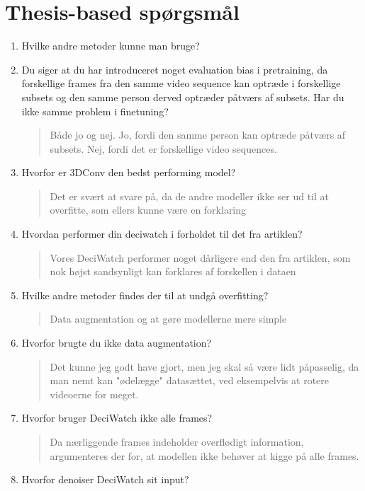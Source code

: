 \documentclass[a4paper]{report}
\begin{document}
\section*{Thesis-based spørgsmål}
\begin{enumerate}
    \item Hvilke andre metoder kunne man bruge?
    \item Du siger at du har introduceret noget evaluation bias i pretraining, da forskellige frames fra den samme video sequence kan optræde i forskellige subsets og den samme person derved optræder påtværs af subsets. Har du ikke samme problem i finetuning?
    \begin{quote}
        Både jo og nej. Jo, fordi den samme person kan optræde påtværs af subsets. Nej, fordi det er forskellige video sequences.
    \end{quote}
    \item Hvorfor er 3DConv den bedst performing model?
    \begin{quote}
        Det er svært at svare på, da de andre modeller ikke ser ud til at overfitte, som ellers kunne være en forklaring
    \end{quote}
    \item Hvordan performer din deciwatch i forholdet til det fra artiklen?
    \begin{quote}
        Vores DeciWatch performer noget dårligere end den fra artiklen, som nok højst sandsynligt kan forklares af forskellen i dataen
    \end{quote}
    \item Hvilke andre metoder findes der til at undgå overfitting?
    \begin{quote}
        Data augmentation og at gøre modellerne mere simple
    \end{quote}
    \item Hvorfor brugte du ikke data augmentation?
    \begin{quote}
        Det kunne jeg godt have gjort, men jeg skal så være lidt påpasselig, da man nemt kan "ødelægge" datasættet, ved eksempelvis at rotere videoerne for meget.
    \end{quote}
    \item Hvorfor bruger DeciWatch ikke alle frames?
    \begin{quote}
        Da nærliggende frames indeholder overflødigt information, argumenteres der for, at modellen ikke behøver at kigge på alle frames.
    \end{quote}
    \item Hvorfor denoiser DeciWatch sit input?

\end{enumerate}
\end{document}
